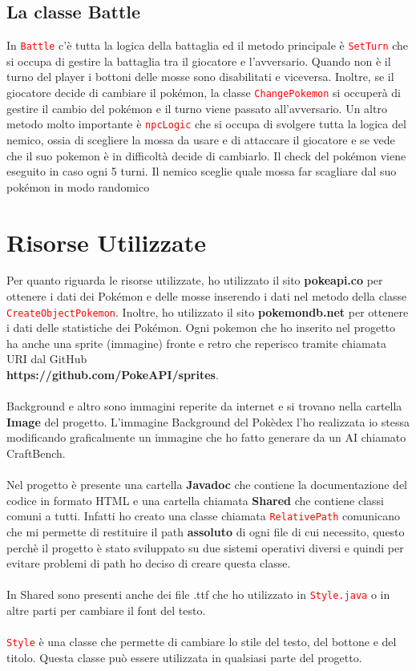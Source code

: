 \documentclass[12pt]{article}
\begin{document}
\subsection{La classe Battle}
In \texttt{\textcolor{red}{Battle}} c'è tutta la logica della battaglia ed il metodo principale è \texttt{\textcolor{red}{SetTurn}} che si occupa di gestire la battaglia tra il giocatore e l'avversario.
Quando non è il turno del player i bottoni delle mosse sono disabilitati e viceversa. Inoltre, se il giocatore decide di cambiare il pokémon, la classe \texttt{\textcolor{red}{ChangePokemon}} si occuperà di gestire il cambio del pokémon e il turno viene passato all'avversario. Un altro metodo molto importante è \texttt{\textcolor{red}{npcLogic}} che si occupa di svolgere tutta la logica del nemico, ossia di scegliere la mossa da usare e di attaccare il giocatore e se vede che il suo pokemon è in difficoltà decide di cambiarlo.
Il check del pokémon viene eseguito in caso ogni 5 turni. Il nemico sceglie quale mossa far scagliare dal suo pokémon in modo randomico\\
\section{Risorse Utilizzate}
Per quanto riguarda le risorse utilizzate, ho utilizzato il sito \textbf{pokeapi.co} per ottenere i dati dei Pokémon e delle mosse inserendo i dati nel metodo della classe \texttt{\textcolor{red}{CreateObjectPokemon}}. Inoltre, ho utilizzato il sito \textbf{pokemondb.net} per ottenere i dati delle statistiche dei Pokémon.
Ogni pokemon che ho inserito nel progetto ha anche una sprite (immagine) fronte e retro che reperisco tramite chiamata URI dal GitHub \\ \textbf{https://github.com/PokeAPI/sprites}.
\\ \\
Background e altro sono immagini reperite da internet e si trovano nella cartella \textbf{Image} del progetto. L'immagine Background del Pokèdex l'ho realizzata io stessa modificando graficalmente un immagine che ho fatto generare da un AI chiamato CraftBench.
\\ \\
Nel progetto è presente una cartella \textbf{Javadoc} che contiene la documentazione del codice in formato HTML e una cartella chiamata \textbf{Shared} che contiene classi comuni a tutti.
Infatti ho creato una classe chiamata \texttt{\textcolor{red}{RelativePath}} comunicano che mi permette di restituire il path \textbf{assoluto} di ogni file di cui necessito, questo perchè il progetto è stato sviluppato su due sistemi operativi diversi e quindi per evitare problemi di path ho deciso di creare questa classe.
\\ \\
In Shared sono presenti anche dei file .ttf che ho utilizzato in \texttt{\textcolor{red}{Style.java}} o in altre parti per cambiare il font del testo.
\\ \\
\texttt{\textcolor{red}{Style}} è una classe che permette di cambiare lo stile del testo, del bottone e del titolo. Questa classe può essere utilizzata in qualsiasi parte del progetto.
\end{document}
